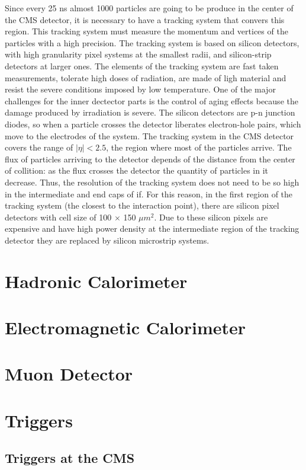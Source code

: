 Since every 25 ns almost 1000 particles are going to be produce in the center of the CMS detector, it is necessary to have a tracking system that convers this region. This tracking system must measure the momentum and vertices of the particles with a high precision. The tracking system is based on silicon detectors, with high granularity pixel systems at the smallest radii, and silicon-strip detectors at larger ones. 
The elements of the tracking system are fast taken measurements, tolerate high doses of radiation, are made of ligh material and resist the severe conditions imposed by low temperature. One of the major challenges for the inner dectector parts is the control of aging effects because the damage produced by irradiation is severe. The silicon detectors are p-n junction diodes, so when a particle crosses the detector liberates electron-hole pairs, which move to the electrodes of the system. The tracking system in the CMS detector covers the range of $| \eta|<2.5$, the region where most of the particles arrive. 
The flux of particles arriving to the detector depends of the distance from the center of collition: as the flux crosses the detector the quantity of particles in it decrease. Thus, the resolution of the tracking system does not need to be so high in the intermediate and end caps of if. For this reason, in the first region of the tracking system (the closest to the interaction point), there are silicon pixel detectors with cell size of 100 $\times$ 150 $\mu m^2$. Due to these silicon pixels are expensive and have high power density at the intermediate region of the tracking detector they are replaced by silicon microstrip systems.

\section{Hadronic Calorimeter}

\section{Electromagnetic Calorimeter}

\section{Muon Detector}

\section{Triggers}


\subsection{Triggers at the CMS}